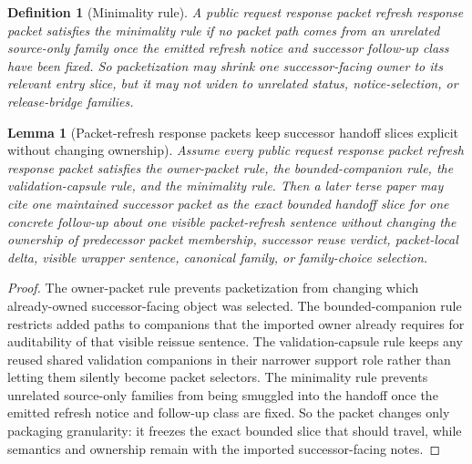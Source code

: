 \documentclass[11pt]{article}
\newtheorem{definition}{Definition}
\newtheorem{lemma}{Lemma}
\begin{document}
\begin{definition}[Minimality rule]
A public request response packet refresh response packet satisfies the \emph{minimality rule} if no packet path comes from an unrelated source-only family once the emitted refresh notice and successor follow-up class have been fixed.
So packetization may shrink one successor-facing owner to its relevant entry slice, but it may not widen to unrelated status, notice-selection, or release-bridge families.
\end{definition}

\begin{lemma}[Packet-refresh response packets keep successor handoff slices explicit without changing ownership]
Assume every public request response packet refresh response packet satisfies the owner-packet rule, the bounded-companion rule, the validation-capsule rule, and the minimality rule.
Then a later terse paper may cite one maintained successor packet as the exact bounded handoff slice for one concrete follow-up about one visible packet-refresh sentence without changing the ownership of predecessor packet membership, successor reuse verdict, packet-local delta, visible wrapper sentence, canonical family, or family-choice selection.
\end{lemma}

\begin{proof}
The owner-packet rule prevents packetization from changing which already-owned successor-facing object was selected.
The bounded-companion rule restricts added paths to companions that the imported owner already requires for auditability of that visible reissue sentence.
The validation-capsule rule keeps any reused shared validation companions in their narrower support role rather than letting them silently become packet selectors.
The minimality rule prevents unrelated source-only families from being smuggled into the handoff once the emitted refresh notice and follow-up class are fixed.
So the packet changes only packaging granularity: it freezes the exact bounded slice that should travel, while semantics and ownership remain with the imported successor-facing notes.\qedhere
\end{proof}
\end{document}
